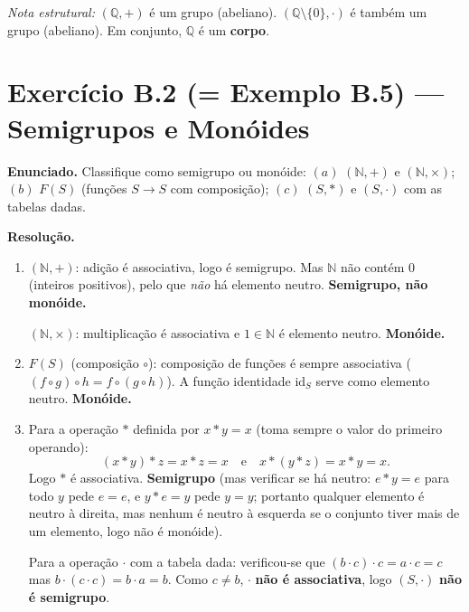 \documentclass[12pt,a4paper]{article}
\newcommand{\keyword}[1]{\textbf{\textcolor{azul}{#1}}}
\begin{document}
\medskip
\noindent\textit{Nota estrutural:} $(\mathbb{Q}, +)$ é um grupo (abeliano). $(\mathbb{Q}\setminus\{0\}, \cdot)$
é também um grupo (abeliano). Em conjunto, $\mathbb{Q}$ é um \keyword{corpo}.

\section*{Exercício B.2 (= Exemplo B.5) — Semigrupos e Monóides}

\textbf{Enunciado.} Classifique como semigrupo ou monóide:
$(a)$ $(\mathbb{N}, +)$ e $(\mathbb{N}, \times)$;\;
$(b)$ $F(S)$ (funções $S \to S$ com composição);\;
$(c)$ $(S, *)$ e $(S, \cdot)$ com as tabelas dadas.

\medskip
\textbf{Resolução.}

\begin{enumerate}[label=(\alph*)]
  \item $(\mathbb{N}, +)$: adição é associativa, logo é semigrupo. Mas $\mathbb{N}$ não
        contém $0$ (inteiros positivos), pelo que \emph{não} há elemento neutro.
        \textbf{Semigrupo, não monóide.}

        $(\mathbb{N}, \times)$: multiplicação é associativa e $1 \in \mathbb{N}$ é
        elemento neutro. \textbf{Monóide.}

  \item $F(S)$ (composição $\circ$): composição de funções é sempre associativa ($(f \circ g) \circ h = f \circ (g \circ h)$). A função identidade $\text{id}_S$ serve como elemento neutro. \textbf{Monóide.}

  \item Para a operação $*$ definida por $x * y = x$ (toma sempre o valor do primeiro operando):
        \[
          (x * y) * z = x * z = x \quad\text{e}\quad x * (y * z) = x * y = x.
        \]
        Logo $*$ é associativa. \textbf{Semigrupo} (mas verificar se há neutro: $e * y = e$
        para todo $y$ pede $e = e$, e $y * e = y$ pede $y = y$; portanto qualquer elemento
        é neutro à direita, mas nenhum é neutro à esquerda se o conjunto tiver mais de um
        elemento, logo não é monóide).

        Para a operação $\cdot$ com a tabela dada: verificou-se que
        $(b \cdot c) \cdot c = a \cdot c = c$ mas $b \cdot (c \cdot c) = b \cdot a = b$.
        Como $c \ne b$, $\cdot$ \textbf{não é associativa}, logo $(S, \cdot)$ \textbf{não é semigrupo}.
\end{enumerate}
\end{document}
